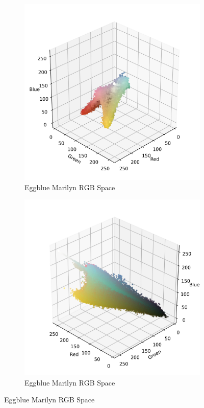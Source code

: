 \documentclass{article}
\begin{document}
\begin{figure}[ht]
  \centering
  \begin{subfigure}{0.45\textwidth}
    \includegraphics[width=\textwidth]{main_files/figure-latex/4_17_eggblue_marilyn_original_scatter.jpg}
    \caption{Eggblue Marilyn RGB Space}
    \label{fig:4_17_eggblue_marilyn_original_scatter}
  \end{subfigure}
  \hfill
  \begin{subfigure}{0.45\textwidth}
    \includegraphics[width=\textwidth]{main_files/figure-latex/4_18_eggblue_marilyn_original_scatter.jpg}
    \caption{Eggblue Marilyn RGB Space}
    \label{fig:4_18_eggblue_marilyn_original_scatter}
  \end{subfigure}
  \label{fig:eggblue_marilyn_original_scatter_1}
\end{figure}
\end{document}
